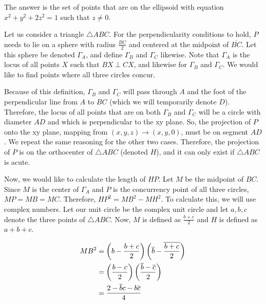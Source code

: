 \documentclass[10pt]{../usamts}
\begin{document}
\begin{solution}
The answer is the set of points that are on the ellipsoid with equation $x^2 + y^2 + 2z^2 = 1$ such that $z \neq 0$.

Let us consider a triangle $\triangle ABC$. For the perpendicularity conditions to hold, $P$ needs to lie on a sphere with radius $\frac{BC}{2}$ and centered at the midpoint of $\overline{BC}$. Let this sphere be denoted $\Gamma_A$, and define $\Gamma_B$ and $\Gamma_C$ likewise. Note that $\Gamma_A$ is the locus of all points $X$ such that $BX \perp CX$, and likewise for $\Gamma_B$ and $\Gamma_C$. We would like to find points where all three circles concur.

Because of this definition, $\Gamma_B$ and $\Gamma_C$ will pass through $A$ and the foot of the perpendicular line from $A$ to $BC$ (which we will temporarily denote $D$). Therefore, the locus of all points that are on both $\Gamma_B$ and $\Gamma_C$ will be a circle with diameter $AD$ and which is perpendicular to the xy plane. So, the projection of $P$ onto the xy plane, mapping from $(x,y,z) \rightarrow (x,y,0)$, must be on segment $AD$. We repeat the same reasoning for the other two cases. Therefore, the projection of $P$ is on the orthocenter of $\triangle ABC$ (denoted $H$), and it can only exist if $\triangle ABC$ is acute.

Now, we would like to calculate the length of $HP$. Let $M$ be the midpoint of $BC$. Since $M$ is the center of $\Gamma_A$ and $P$ is the concurrency point of all three circles, $MP = MB = MC$. Therefore, $HP^2 = MB^2 - MH^2$. To calculate this, we will use complex numbers. Let our unit circle be the complex unit circle and let $a,b,c$ denote the three points of $\triangle ABC$. Now, $M$ is defined as $\frac{b+c}{2}$ and $H$ is defined as $a+b+c$.

\newcommand{\ol}{\overline}

\begin{align*}
    MB^2 &= \paren{b - \frac{b+c}{2}}\paren{\ol{b} - \ol{\frac{b+c}{2}}}\\
         &= \paren{\frac{b-c}{2}}\paren{\frac{\ol{b}-\ol{c}}{2}}\\
         &=\frac{2-\ol{b}c-b\ol{c}}{4}\\
\end{align*}


\end{solution}
\end{document}

